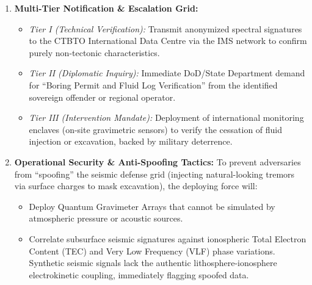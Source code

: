 \documentclass[11pt,a4paper]{article}
\begin{document}
\begin{enumerate}
    \item \textbf{Multi-Tier Notification \& Escalation Grid:}
    \begin{itemize}
        \item \emph{Tier I (Technical Verification):} Transmit anonymized spectral signatures to the CTBTO International Data Centre via the IMS network to confirm purely non-tectonic characteristics.
        \item \emph{Tier II (Diplomatic Inquiry):} Immediate DoD/State Department demand for ``Boring Permit and Fluid Log Verification'' from the identified sovereign offender or regional operator.
        \item \emph{Tier III (Intervention Mandate):} Deployment of international monitoring enclaves (on-site gravimetric sensors) to verify the cessation of fluid injection or excavation, backed by military deterrence.
    \end{itemize}
    
    \item \textbf{Operational Security \& Anti-Spoofing Tactics:}
    To prevent adversaries from ``spoofing'' the seismic defense grid (injecting natural-looking tremors via surface charges to mask excavation), the deploying force will:
    \begin{itemize}
        \item Deploy Quantum Gravimeter Arrays that cannot be simulated by atmospheric pressure or acoustic sources.
        \item Correlate subsurface seismic signatures against ionospheric Total Electron Content (TEC) and Very Low Frequency (VLF) phase variations. Synthetic seismic signals lack the authentic lithosphere-ionosphere electrokinetic coupling, immediately flagging spoofed data.
    \end{itemize}
\end{enumerate}
\end{document}
